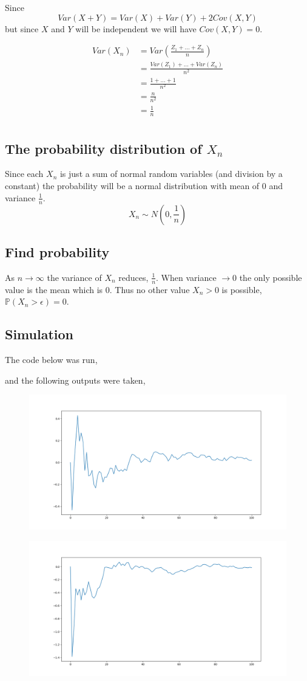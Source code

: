 \documentclass{article}
\newcommand{\prob}{\mathbb{P}}
\begin{document}
Since
\[
    Var(X + Y) = Var(X) + Var(Y) + 2Cov(X,Y)
\]
but since $X$ and $Y$ will be independent we will have $Cov(X,Y) = 0$.

\begin{align*}
    Var(X_n) &= Var\left(\frac{Z_1 + \dots + Z_{n}}{n}\right) \\
    &= \frac{Var(Z_1) + \dots + Var(Z_{n})}{n^2} \\
    &= \frac{1 + \dots + 1}{n^2} \\
    &= \frac{n}{n^2} \\
    &= \frac{1}{n} \\
\end{align*}

\subsection{The probability distribution of $X_n$}
Since each $X_n$ is just a sum of normal random variables (and division by a
constant) the probability will be a normal distribution with mean of 0 and
variance $\frac{1}{n}$.
\[
    X_n \sim N\left(0, \frac{1}{n}\right)
\]

\subsection{Find probability}
As $n \to \infty$ the variance of $X_n$ reduces, $\frac{1}{n}$. When
variance $\to 0$ the only possible value is the mean which is $0$.
Thus no other value $X_n > 0$ is possible,
$\prob (X_n > \epsilon) = 0$.

\subsection{Simulation}
The code below was run,


and the following outputs were taken,
\begin{figure}[H]
    \centering
    \includegraphics[width=5in]{figure1.png}
\end{figure}
\begin{figure}[H]
    \centering
    \includegraphics[width=5in]{figure2.png}
\end{figure}
\end{document}
